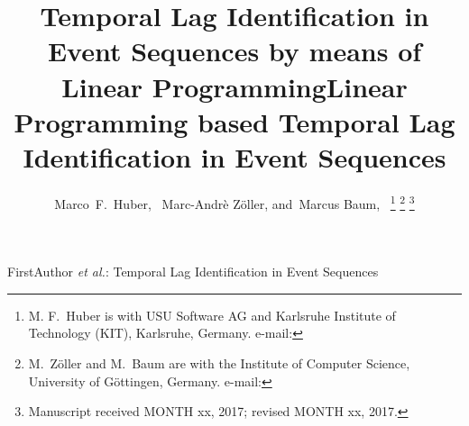 \documentclass[journal, 10pt]{IEEEtran}
\begin{document}
%
\title{Temporal Lag Identification in Event Sequences by means of Linear Programming}
\title{Linear Programming based Temporal Lag Identification in Event Sequences}
%
%
%

\author{Marco~F.~Huber,~
        Marc-Andr\`e Z\"oller, %
        and~Marcus Baum,~%
\thanks{M. F.~Huber is with USU Software AG and Karlsruhe Institute of Technology (KIT), Karlsruhe, Germany.
e-mail: }%
\thanks{M.~Z\"oller and M.~Baum are with the Institute of Computer Science, University of G\"ottingen, Germany. e-mail:  }%
\thanks{Manuscript received MONTH xx, 2017; revised MONTH xx, 2017.}}

% 
%



%
{FirstAuthor \MakeLowercase{\textit{et al.}}: Temporal Lag Identification in Event Sequences}
% 
\end{document}
